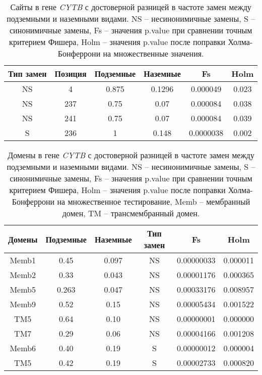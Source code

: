 \begin{table}[h!]
	\caption{Сайты в гене \textit{CYTB} с достоверной разницей в частоте замен между подземными и наземными видами. NS -- несинонимичные замены, S -- синонимичные замены, Fs -- значения p.value при сравнении точным критерием Фишера, Holm -- значения p.value после поправки Холма-Бонферрони на множественные значения.}
	\label{CytB_sites}
	\vspace{5mm}
	
	\begin{center}
		\begin{tabular}{|c|c|c|c|c|c|}
			\hline 
			\textbf{Тип замен} & \textbf{Позиция} & \textbf{Подземные} & \textbf{Наземные} & \textbf{Fs} & \textbf{Holm} \\ \hline 
			NS & 4 & 0.875 & 0.1296 & 0.000049 & 0.023 \\ \hline 
			NS & 237 & 0.75 & 0.07 & 0.000084 & 0.038 \\ \hline 
			NS & 241 & 0.75 & 0.07 & 0.000084 & 0.039 \\ \hline 
			S & 236 & 1 & 0.148 & 0.0000038 & 0.002 \\ \hline 
		\end{tabular} 
	\end{center}
\end{table}

\begin{table}[h!]
	\caption{Домены в гене \textit{CYTB} с достоверной разницей в частоте замен между подземными и наземными видами. NS -- несинонимичные замены, S -- синонимичные замены, Fs -- значения p.value при сравнении точным критерием Фишера, Holm -- значения p.value после поправки Холма-Бонферрони на множественное тестирование, Memb -- мембранный домен, TM -- трансмембранный домен.}\label{CytB_domains}
	\vspace{5mm}
	\begin{center}	
		\begin{tabular}{|c|c|c|c|c|c|}
			\hline 
			\textbf{Домены} & \textbf{Подземные} & \textbf{Наземные} & \textbf{Тип замен} & \textbf{Fs} & \textbf{Holm}\\ \hline 
			Memb1 & 0.45 & 0.097 & NS & 0.00000033 & 0.000011\\ \hline 
			Memb2 & 0.33 & 0.043 & NS & 0.00001176 & 0.000365\\ \hline 
			Memb5 & 0.263 & 0.047 & NS & 0.00033176 & 0.008957\\ \hline 
			Memb9 & 0.52 & 0.15 & NS & 0.00005434 & 0.001522\\ \hline 
			TM5 & 0.64 & 0.10 & NS & 0.00000001 & 0.000000\\ \hline 
			TM7 & 0.29 & 0.06 & NS & 0.00004166 & 0.001208\\ \hline 
			Memb6 & 0.40 & 0.19 & S & 0.00000012 & 0.000004\\ \hline 
			TM5 & 0.42 & 0.19 & S & 0.00002733 & 0.000820 \\ \hline
		\end{tabular} 
	\end{center}
	
\end{table}

